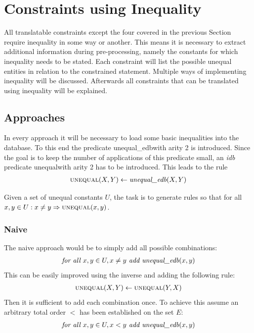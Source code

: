 \documentclass[hyperref,bachelorofscience,fleqn]{cgvpub}
\begin{document}
\section{Constraints using Inequality}\label{sec_constraints_using_inequality}
All translatable constraints except the four covered in the previous Section require inequality in some way or another. This means it is necessary to extract additional information during pre-processing, namely the constants for which inequality needs to be stated. Each constraint will list the possible unequal entities in relation to the constrained statement. Multiple ways of implementing inequality will be discussed. Afterwards all constraints that can be translated using inequality will be explained.

\subsection{Approaches}
In every approach it will be necessary to load some basic inequalities into the database. To this end the predicate unequal\_edbwith arity 2 is introduced. Since the goal is to keep the number of applications of this predicate small, an \emph{idb} predicate unequalwith arity 2 has to be introduced. This leads to the rule
\begin{align}
\textsc{unequal}(X, Y) \leftarrow \emph{unequal\_edb}(X, Y)
\end{align}

Given a set of unequal constants \(U\), the task is to generate rules so that for all \( x, y \in U: x \ne y \Rightarrow \textsc{unequal}(x, y)\).

\subsubsection{Naive}\label{subsubsec_naive}
The naive approach would be to simply add all possible combinations:
\begin{align}
\emph{for all } x, y \in U, x \ne y \emph{ add } \emph{unequal\_edb}(x, y)
\end{align}
This can be easily improved using the inverse and adding the following rule:
\begin{align}\label{equ_inverse}
\textsc{unequal}(X, Y) \leftarrow \textsc{unequal}(Y, X)
\end{align}
Then it is sufficient to add each combination once. To achieve this assume an arbitrary total order \(<\) has been established on the set \(E\):
\begin{align}
\emph{for all } x, y \in U, x < y \emph{ add } \emph{unequal\_edb}(x, y)
\end{align}
\end{document}
